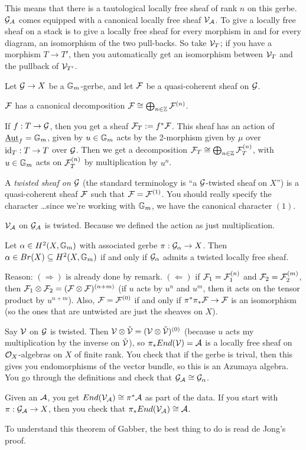 This means that there is a tautological locally free sheaf of rank
$n$ on this gerbe. $\mathcal{G}_{\mathcal{A}}$ comes equipped with a canonical locally
free sheaf $\mathcal{V}_{\mathcal{A}}$. To give a locally free sheaf on a stack is to
give a locally free sheaf for every morphism in and for every
diagram, an isomorphism of the two pull-backs. So take $\mathcal{V}_T$; if you
have a morphism $T\to T'$, then you automatically get an isomorphism
between $\mathcal{V}_T$ and the pullback of $\mathcal{V}_{T'}$.

Let $\mathcal{G}\to X$ be a $\mathbb{G}_m$-gerbe, and let $\mathcal{F}$ be a quasi-coherent
sheaf on $\mathcal{G}$.
\begin{proposition}
  $\mathcal{F}$ has a canonical decomposition $\mathcal{F}\cong \bigoplus_{n\in \mathbb{Z}}
\mathcal{F}^{(n)}$.
\end{proposition}
If $f:T\to \mathcal{G}$, then you get a sheaf $\mathcal{F}_T:=f^*\mathcal{F}$. This sheaf has an
action of $\operatorname{\underline{Aut}}_f=\mathbb{G}_m$, given by $u\in \mathbb{G}_m$ acts by the
2-morphism given by $\mu$ over $\operatorname{id}_T:T\to T$ over $\mathcal{G}$. Then we get
a decomposition $\mathcal{F}_T\cong \bigoplus_{n\in \mathbb{Z}}\mathcal{F}_T^{(n)}$, with
$u\in \mathbb{G}_m$ acts on $\mathcal{F}_{T}^{(n)}$ by multiplication by $u^n$.

\begin{definition}
  A \emph{twisted sheaf on $\mathcal{G}$} (the standard terminology is ``a
$\mathcal{G}$-twisted sheaf on $X$'') is a quasi-coherent sheaf $\mathcal{F}$ such that
$\mathcal{F}=\mathcal{F}^{(1)}$. You should really specify the character \dots since
we're working with $\mathbb{G}_m$, we have the canonical character $(1)$.
\end{definition}
\begin{remark}
  $\mathcal{V}_{\mathcal{A}}$ on $\mathcal{G}_{\mathcal{A}}$ is twisted. Because we defined the action as
just multiplication.
\end{remark}
\begin{proposition}
  Let $\alpha\in H^2(X,\mathbb{G}_m)$ with associated gerbe
$\pi:\mathcal{G}_\alpha\to X$. Then $\alpha\in Br(X)\subseteq H^2(X,\mathbb{G}_m)$ if
and only if $\mathcal{G}_\alpha$ admits a twisted locally free sheaf.
\end{proposition}
Reason: $(\Rightarrow)$ is already done by remark. $(\Leftarrow)$ if
$\mathcal{F}_1=\mathcal{F}_1^{(n)}$ and $\mathcal{F}_2=\mathcal{F}_2^{(m)}$, then $\mathcal{F}_1\otimes \mathcal{F}_2 =
(\mathcal{F}\otimes \mathcal{F})^{(n+m)}$ (if $u$ acts by $u^n$ and $u^m$, then it acts
on the tensor product by $u^{n+m}$). Also, $\mathcal{F}=\mathcal{F}^{(0)}$ if and only
if $\pi^*\pi_*\mathcal{F}\to \mathcal{F}$ is an isomorphism (so the ones that are
untwisted are just the sheaves on $X$).

Say $\mathcal{V}$ on $\mathcal{G}$ is twisted. Then $\mathcal{V}\otimes \check{\mathcal{V}}=(\mathcal{V}\otimes
\check {\mathcal{V}})^{(0)}$ (because $u$ acts my multiplication by the inverse
on $\check{\mathcal{V}}$), so $\pi_*End(\mathcal{V})=\mathcal{A}$ is a locally free sheaf on
$\mathcal{O}_X$-algebras on $X$ of finite rank. You check that if the gerbe is
trival, then this gives you endomorphisms of the vector bundle, so
this is an Azumaya algebra. You go through the definitions and check
that $\mathcal{G}_{\mathcal{A}}\cong \mathcal{G}_\alpha$.
\begin{remark}[Aside]
  Given an $\mathcal{A}$, you get $End(\mathcal{V}_{\mathcal{A}})\cong \pi^* \mathcal{A}$ as part of the
data. If you start with $\pi:\mathcal{G}_{\mathcal{A}}\to X$, then you check that
$\pi_*End(\mathcal{V}_{\mathcal{A}})\cong \mathcal{A}$.
\end{remark}
To understand this theorem of Gabber, the best thing to do is read de
Jong's proof.

